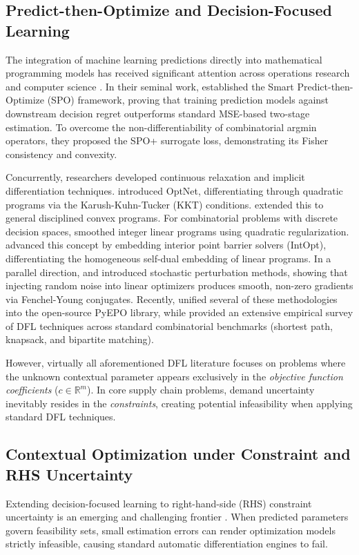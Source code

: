 \documentclass[11pt,a4paper]{article}
\theoremstyle{definition}
\theoremstyle{remark}
\begin{document}
\subsection{Predict-then-Optimize and Decision-Focused Learning}
The integration of machine learning predictions directly into mathematical programming models has received significant attention across operations research and computer science \citep{bengio2021machine,sadana2025survey}. In their seminal work, \citet{elmachtoub2022smart} established the Smart Predict-then-Optimize (SPO) framework, proving that training prediction models against downstream decision regret outperforms standard MSE-based two-stage estimation. To overcome the non-differentiability of combinatorial argmin operators, they proposed the SPO+ surrogate loss, demonstrating its Fisher consistency and convexity.

Concurrently, researchers developed continuous relaxation and implicit differentiation techniques. \citet{amos2017optnet} introduced OptNet, differentiating through quadratic programs via the Karush-Kuhn-Tucker (KKT) conditions. \citet{agrawal2019differentiable} extended this to general disciplined convex programs. For combinatorial problems with discrete decision spaces, \citet{wilder2019melding} smoothed integer linear programs using quadratic regularization. \citet{mandi2020interior} advanced this concept by embedding interior point barrier solvers (IntOpt), differentiating the homogeneous self-dual embedding of linear programs. In a parallel direction, \citet{berthet2020learning} and \citet{pogancic2020differentiation} introduced stochastic perturbation methods, showing that injecting random noise into linear optimizers produces smooth, non-zero gradients via Fenchel-Young conjugates. Recently, \citet{tang2024pyepo} unified several of these methodologies into the open-source PyEPO library, while \citet{mandi2024decision} provided an extensive empirical survey of DFL techniques across standard combinatorial benchmarks (shortest path, knapsack, and bipartite matching).

However, virtually all aforementioned DFL literature focuses on problems where the unknown contextual parameter appears exclusively in the \textit{objective function coefficients} ($c \in \mathbb{R}^m$). In core supply chain problems, demand uncertainty inevitably resides in the \textit{constraints}, creating potential infeasibility when applying standard DFL techniques.

\subsection{Contextual Optimization under Constraint and RHS Uncertainty}
Extending decision-focused learning to right-hand-side (RHS) constraint uncertainty is an emerging and challenging frontier \citep{sadana2025survey}. When predicted parameters govern feasibility sets, small estimation errors can render optimization models strictly infeasible, causing standard automatic differentiation engines to fail. 
\end{document}
